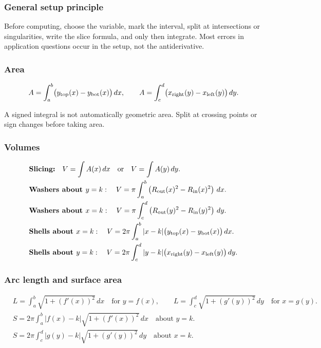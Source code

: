 \subsubsection{General setup principle}
\begin{examtip}
Before computing, choose the variable, mark the interval, split at intersections
or singularities, write the slice formula, and only then integrate.  Most errors
in application questions occur in the setup, not the antiderivative.
\end{examtip}

\subsubsection{Area}
\begin{keyformula}[title={Area Between Curves}]
\[
A=\int_a^b\bigl(y_{\rm top}(x)-y_{\rm bot}(x)\bigr)\,dx,
\qquad
A=\int_c^d\bigl(x_{\rm right}(y)-x_{\rm left}(y)\bigr)\,dy.
\]
\end{keyformula}

\begin{commonmistake}
A signed integral is not automatically geometric area.  Split at crossing points
or sign changes before taking area.
\end{commonmistake}

\subsubsection{Volumes}
\begin{keyformula}[title={Slicing, Washers, and Shells}]
\begin{align*}
&\textbf{Slicing:}\quad V=\int A(x)\,dx\quad\text{or}\quad V=\int A(y)\,dy.\\
&\textbf{Washers about }y=k:\quad
V=\pi\int_a^b\left(R_{\rm out}(x)^2-R_{\rm in}(x)^2\right)\,dx.\\
&\textbf{Washers about }x=k:\quad
V=\pi\int_c^d\left(R_{\rm out}(y)^2-R_{\rm in}(y)^2\right)\,dy.\\
&\textbf{Shells about }x=k:\quad
V=2\pi\int_a^b |x-k|\bigl(y_{\rm top}(x)-y_{\rm bot}(x)\bigr)\,dx.\\
&\textbf{Shells about }y=k:\quad
V=2\pi\int_c^d |y-k|\bigl(x_{\rm right}(y)-x_{\rm left}(y)\bigr)\,dy.
\end{align*}
\end{keyformula}

\subsubsection{Arc length and surface area}
\begin{keyformula}[title={Arc Length and Surface Area of Revolution}]
\begin{align*}
&L=\int_a^b\sqrt{1+(f'(x))^2}\,dx\quad\text{for }y=f(x),
\qquad
L=\int_c^d\sqrt{1+(g'(y))^2}\,dy\quad\text{for }x=g(y).\\
&S=2\pi\int_a^b |f(x)-k|\sqrt{1+(f'(x))^2}\,dx
\quad\text{about }y=k.\\
&S=2\pi\int_c^d |g(y)-k|\sqrt{1+(g'(y))^2}\,dy
\quad\text{about }x=k.
\end{align*}
\end{keyformula}


